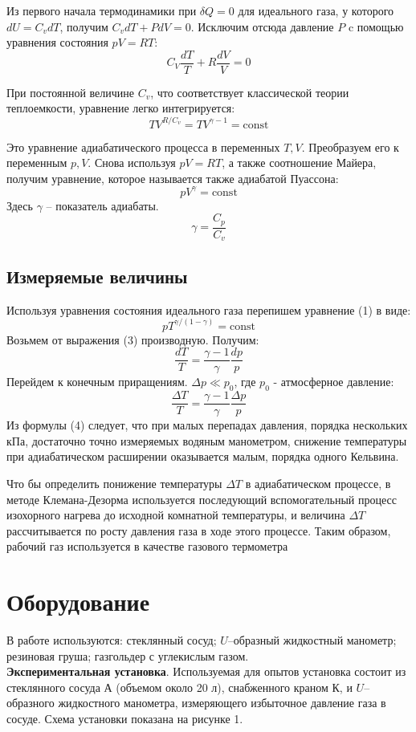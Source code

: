 \documentclass[a4paper,12pt]{article}
\theoremstyle{plain} %
\theoremstyle{definition} %
\theoremstyle{remark} %
\begin{document}
	Из первого начала термодинамики при $\delta Q = 0$ для идеального газа, у которого $dU = C_v dT$, получим $C_v dT + P dV = 0$. Исключим отсюда давление $P$ c помощью уравнения состояния $pV = RT$:
	\[C_V\frac{dT}{T}+R\frac{dV}{V} = 0 \]
	
	При постоянной величине $C_v$, что соответствует классической теории теплоемкости, уравнение легко интегрируется:
	\[TV^{R/C_v} = TV^{\gamma - 1} = \text{const} \]
	
	Это уравнение адиабатического процесса в переменных $T, V$. Преобразуем его к переменным $p, V$. Снова используя $pV = RT$, а также соотношение Майера, получим уравнение, которое называется также адиабатой Пуассона:
	\begin{equation}
	pV^{\gamma} = \text{const}
	\end{equation}
	Здесь $\gamma$ -- показатель адиабаты.
	\begin{equation}
	\gamma = \frac{C_p}{C_v}
	\end{equation}
	
	\subsection{Измеряемые величины}
	Используя уравнения состояния идеального газа перепишем уравнение (1) в виде:
	\begin{equation}
	pT^{\gamma/(1-\gamma)} = \text{const}
	\end{equation}
	Возьмем от выражения (3) производную. Получим:
	\[\frac{dT}{T} = \frac{\gamma - 1}{\gamma}\frac {dp}{p} \]
	Перейдем к конечным приращениям. $\Delta p \ll p_0$, где $p_0$ - атмосферное давление:
	\begin{equation}
	\frac{\Delta T}{T} = \frac{\gamma - 1}{\gamma}\frac {\Delta p}{p}
	\end{equation}
	Из формулы (4) следует, что при малых перепадах давления, порядка нескольких кПа, достаточно точно измеряемых водяным манометром, снижение температуры при адиабатическом расширении оказывается малым, порядка одного Кельвина.
	
	Что бы определить понижение температуры $\Delta T$ в адиабатическом процессе, в методе Клемана-Дезорма используется последующий вспомогательный процесс изохорного нагрева до исходной комнатной температуры, и величина  $\Delta T$ рассчитывается по росту давления газа в ходе этого процессе. Таким образом, рабочий газ используется в качестве газового термометра
	
	\section{Оборудование}
	В работе используются: стеклянный сосуд; $U$--образный жидкостный манометр; резиновая груша; газгольдер с углекислым газом.\\
	\textbf{Экспериментальная установка}. 
	Используемая для опытов установка состоит из стеклянного сосуда $\text{А}$ (объемом около 20 л), снабженного краном $\text{К}$, и $U$--образного жидкостного манометра, измеряющего избыточное давление газа в сосуде. Схема установки показана на рисунке 1.
	
\end{document}
